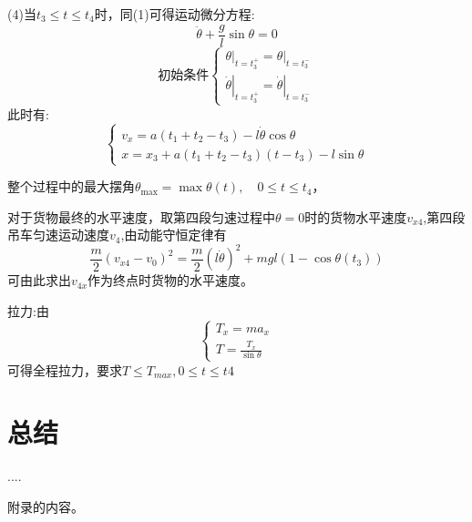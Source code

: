 \documentclass{cumcmthesis}
\begin{document}
(4)当$t_3 \leq t \leq t_4$时，同(1)可得运动微分方程:
$$\ddot{\theta}+\frac{g}{l} \sin \theta=0$$
$$\text{初始条件}\left \{\begin{array}{l}
        \left.\theta\right|_{t=t_{3}^{+}}=\left.\theta\right|_{t=t_{3}^{-}} \\
        \left.\dot{\theta}\right|_{t=t_{3}^{+}}=\left.\dot{\theta}\right|_{t=t_{3}^{-}}
    \end{array}\right.$$
此时有:$$\left\{\begin{array}{l}
    v_{x}=a\left(t_1+t_{2}-t_{3}\right)-l \dot{\theta} \cos \theta \\
    x=x_{3}+a\left(t_{1}+t_{2}-t_{3}\right)\left(t-t_{3}\right)-l \sin \theta
    \end{array}\right.$$

整个过程中的最大摆角$\theta_{\max }=\max \theta(t), \quad 0 \leqslant t \leqslant t_{4}$，

对于货物最终的水平速度，取第四段匀速过程中$\theta=0$时的货物水平速度$v_{x4}$,第四段吊车匀速运动速度$v_{4}$,由动能守恒定律有
$$ \frac{m}{2} (v_{x 4}-v_{0})^{2}=\frac{m}{2}(l \dot{\theta})^{2}+m g l\left(1-\cos \theta\left(t_{3}\right)\right) $$
可由此求出$v_{4x}$作为终点时货物的水平速度。

拉力:由$$\left\{\begin{array}{l}
    T_{x}=m a_{x} \\
    T=\frac{T_{x}}{\sin \theta}
    \end{array}\right.$$
可得全程拉力，要求$T \leq T_{max},0 \leq t \leq t4$

\section{总结}
\begin{thebibliography}{9}%
     ....
\end{thebibliography}
\begin{appendices}
    附录的内容。
\end{appendices}
\end{document}
